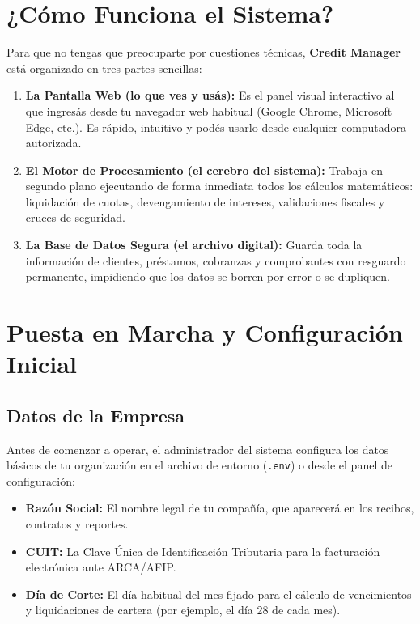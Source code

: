 \documentclass[12pt,a4paper]{article}
\renewcommand{\_}{\textunderscore\allowbreak}
\begin{document}
\section{¿Cómo Funciona el Sistema?}
Para que no tengas que preocuparte por cuestiones técnicas, \textbf{Credit Manager} está organizado en tres partes sencillas:
\begin{enumerate}
    \item \textbf{La Pantalla Web (lo que ves y usás):} Es el panel visual interactivo al que ingresás desde tu navegador web habitual (Google Chrome, Microsoft Edge, etc.). Es rápido, intuitivo y podés usarlo desde cualquier computadora autorizada.
    \item \textbf{El Motor de Procesamiento (el cerebro del sistema):} Trabaja en segundo plano ejecutando de forma inmediata todos los cálculos matemáticos: liquidación de cuotas, devengamiento de intereses, validaciones fiscales y cruces de seguridad.
    \item \textbf{La Base de Datos Segura (el archivo digital):} Guarda toda la información de clientes, préstamos, cobranzas y comprobantes con resguardo permanente, impidiendo que los datos se borren por error o se dupliquen.
\end{enumerate}

\newpage

\section{Puesta en Marcha y Configuración Inicial}
\subsection{Datos de la Empresa}
Antes de comenzar a operar, el administrador del sistema configura los datos básicos de tu organización en el archivo de entorno (\texttt{.env}) o desde el panel de configuración:
\begin{itemize}
    \item \textbf{Razón Social:} El nombre legal de tu compañía, que aparecerá en los recibos, contratos y reportes.
    \item \textbf{CUIT:} La Clave Única de Identificación Tributaria para la facturación electrónica ante ARCA/AFIP.
    \item \textbf{Día de Corte:} El día habitual del mes fijado para el cálculo de vencimientos y liquidaciones de cartera (por ejemplo, el día 28 de cada mes).
\end{itemize}
\end{document}
